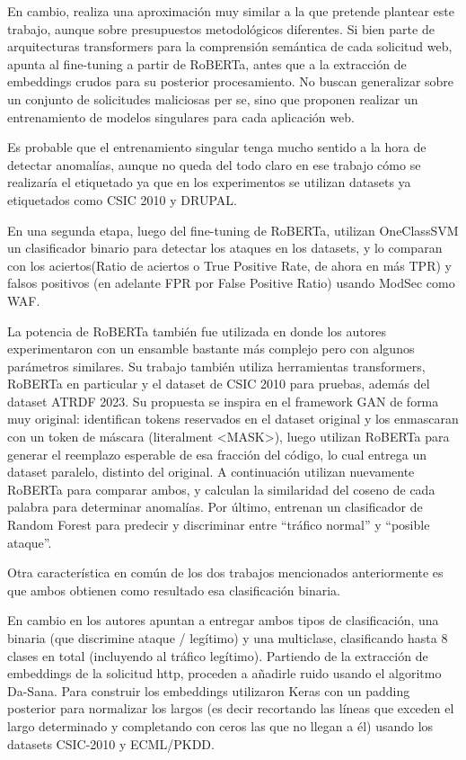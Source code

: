 \documentclass[12pt]{article}
\begin{document}
En cambio, \cite{montes2021web} realiza una aproximación muy similar a la que pretende plantear  este trabajo, aunque sobre presupuestos metodológicos diferentes. Si bien parte de arquitecturas transformers para la comprensión semántica de cada solicitud web, apunta al fine-tuning a partir de RoBERTa, antes que a la extracción de embeddings crudos para su posterior procesamiento. No buscan generalizar sobre un conjunto de solicitudes maliciosas per se, sino que proponen realizar un entrenamiento de modelos singulares para cada aplicación web.

Es probable que el entrenamiento singular tenga mucho sentido a la hora de detectar anomalías, aunque no queda del todo claro en ese trabajo cómo se realizaría el etiquetado ya que en los experimentos se utilizan datasets ya etiquetados como CSIC 2010 y DRUPAL.

En una segunda etapa, luego del fine-tuning de RoBERTa, utilizan OneClassSVM un clasificador binario para detectar los ataques en los datasets, y lo comparan con los aciertos(Ratio de aciertos o True Positive Rate, de ahora en más TPR) y falsos positivos (en adelante FPR por False Positive Ratio) usando ModSec como WAF.

La potencia de RoBERTa también fue utilizada en \cite{aharon2024roberta} donde los autores experimentaron con un ensamble bastante más complejo pero con algunos parámetros similares. Su trabajo también utiliza herramientas transformers, RoBERTa en particular y el dataset de CSIC 2010 para pruebas, además del dataset ATRDF 2023. Su propuesta se inspira en el framework GAN de forma muy original: identifican tokens reservados en el dataset original y los enmascaran con un token de máscara (literalment <MASK>), luego utilizan RoBERTa para generar el reemplazo esperable de esa fracción del código, lo cual entrega un dataset paralelo, distinto del original. A continuación utilizan nuevamente RoBERTa para comparar ambos, y calculan la similaridad del coseno de cada palabra para determinar anomalías. Por último, entrenan un clasificador de Random Forest para predecir y discriminar entre \enquote{tráfico normal} y \enquote{posible ataque}.

Otra característica en común de los dos trabajos mencionados anteriormente es que ambos obtienen como resultado esa clasificación binaria.

En cambio en \cite{karacan2021novel} los autores apuntan a entregar ambos tipos de clasificación, una binaria (que discrimine ataque / legítimo) y una multiclase, clasificando hasta 8 clases en total (incluyendo al tráfico legítimo). Partiendo de la extracción de embeddings de la solicitud http, proceden a añadirle ruido usando el algoritmo Da-Sana.
Para construir los embeddings utilizaron Keras con un padding posterior para normalizar los largos (es decir recortando las líneas que exceden el largo determinado y completando con ceros las que no llegan a él) usando los datasets CSIC-2010 y ECML/PKDD.
\end{document}
